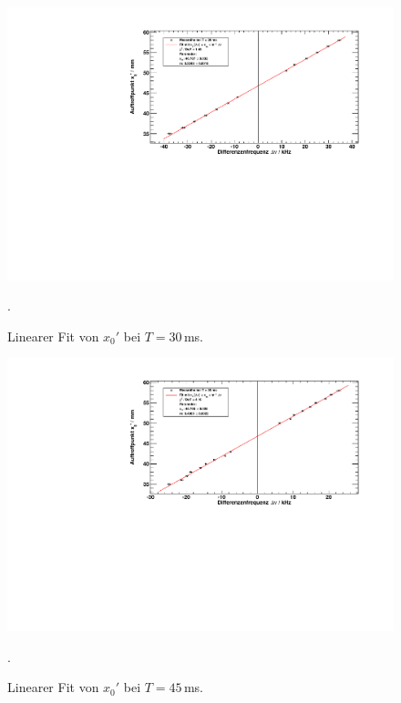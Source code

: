 \begin{figure}[H]
\begin{center}
  \includegraphics[width=\textwidth]{../img/fit_T_30ms.pdf}
  \caption{Linearer Fit von $x_0'$ bei $T = 30$\,ms.}.
  \label{img:fit:x0:30ms}
\end{center}
\end{figure}

\begin{figure}[H]
\begin{center}
  \includegraphics[width=\textwidth]{../img/fit_T_45ms.pdf}
  \caption{Linearer Fit von $x_0'$ bei $T = 45$\,ms.}.
  \label{img:fit:x0:45ms}
\end{center}
\end{figure}

